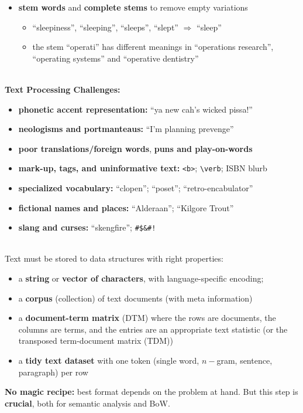 \documentclass[20pt,landscape,footrule,headrule]{foils}
\begin{document}
{{\begin{itemize}
\item \textbf{stem words} and \textbf{complete stems} to remove empty variations 
\begin{itemize}
\item “sleepiness”, “sleeping”, “sleeps”, “slept” $\Longrightarrow$ “sleep”
\item the stem “operati” has different meanings in “operations research”, “operating systems” and “operative dentistry” 
\end{itemize}
\end{itemize}
\newpage\ \\ \noindent 
\textbf{Text Processing Challenges:}
\begin{itemize}
\item \textbf{phonetic accent representation:} ``ya new cah’s wicked pissa!''
\item \textbf{neologisms and portmanteaus:} ``I’m planning prevenge''
\item \textbf{poor translations/foreign words}, \textbf{puns and play-on-words}
\item \textbf{mark-up, tags, and uninformative text:}    \texttt{<b>}; \verb+\verb+; ISBN blurb
\item \textbf{specialized vocabulary:} ``clopen'';  ``poset''; ``retro-encabulator''
\item \textbf{fictional names and places:} ``Alderaan''; ``Kilgore Trout''
\item \textbf{slang and curses:} ``skengfire''; \verb+#$&#!+
\end{itemize}

\newpage\ \\ \noindent
Text must be stored to data structures with right properties:
\begin{itemize}
\item a \textbf{string} or \textbf{vector of characters}, with language-specific encoding;
\item a \textbf{corpus} (collection) of text documents (with meta information)
\item a \textbf{document-term matrix} (DTM) where the rows are documents, the columns are terms, and the entries are an appropriate text statistic (or the transposed term-document matrix (TDM))
\item a \textbf{tidy text dataset} with one token (single word, $n-$gram, sentence, paragraph) per row
\end{itemize}
\textbf{No magic recipe:} best format depends on the problem at hand. But this step is \textbf{crucial}, both for semantic analysis and BoW.

}}
\end{document}

